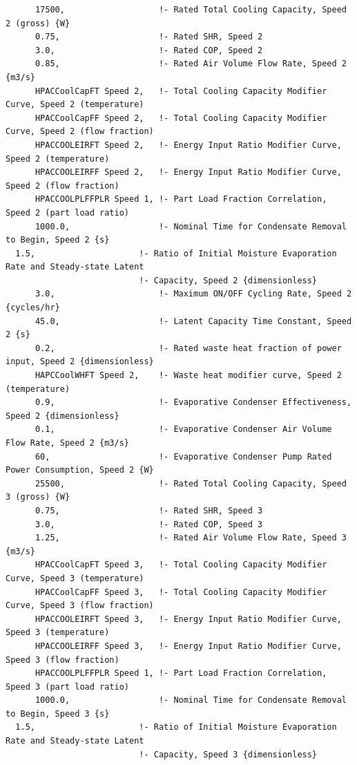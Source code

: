 \begin{lstlisting}
      17500,                   !- Rated Total Cooling Capacity, Speed 2 (gross) {W}
      0.75,                    !- Rated SHR, Speed 2
      3.0,                     !- Rated COP, Speed 2
      0.85,                    !- Rated Air Volume Flow Rate, Speed 2 {m3/s}
      HPACCoolCapFT Speed 2,   !- Total Cooling Capacity Modifier Curve, Speed 2 (temperature)
      HPACCoolCapFF Speed 2,   !- Total Cooling Capacity Modifier Curve, Speed 2 (flow fraction)
      HPACCOOLEIRFT Speed 2,   !- Energy Input Ratio Modifier Curve, Speed 2 (temperature)
      HPACCOOLEIRFF Speed 2,   !- Energy Input Ratio Modifier Curve, Speed 2 (flow fraction)
      HPACCOOLPLFFPLR Speed 1, !- Part Load Fraction Correlation, Speed 2 (part load ratio)
      1000.0,                  !- Nominal Time for Condensate Removal to Begin, Speed 2 {s}
  1.5,                     !- Ratio of Initial Moisture Evaporation Rate and Steady-state Latent
                           !- Capacity, Speed 2 {dimensionless}
      3.0,                     !- Maximum ON/OFF Cycling Rate, Speed 2 {cycles/hr}
      45.0,                    !- Latent Capacity Time Constant, Speed 2 {s}
      0.2,                     !- Rated waste heat fraction of power input, Speed 2 {dimensionless}
      HAPCCoolWHFT Speed 2,    !- Waste heat modifier curve, Speed 2 (temperature)
      0.9,                     !- Evaporative Condenser Effectiveness, Speed 2 {dimensionless}
      0.1,                     !- Evaporative Condenser Air Volume Flow Rate, Speed 2 {m3/s}
      60,                      !- Evaporative Condenser Pump Rated Power Consumption, Speed 2 {W}
      25500,                   !- Rated Total Cooling Capacity, Speed 3 (gross) {W}
      0.75,                    !- Rated SHR, Speed 3
      3.0,                     !- Rated COP, Speed 3
      1.25,                    !- Rated Air Volume Flow Rate, Speed 3 {m3/s}
      HPACCoolCapFT Speed 3,   !- Total Cooling Capacity Modifier Curve, Speed 3 (temperature)
      HPACCoolCapFF Speed 3,   !- Total Cooling Capacity Modifier Curve, Speed 3 (flow fraction)
      HPACCOOLEIRFT Speed 3,   !- Energy Input Ratio Modifier Curve, Speed 3 (temperature)
      HPACCOOLEIRFF Speed 3,   !- Energy Input Ratio Modifier Curve, Speed 3 (flow fraction)
      HPACCOOLPLFFPLR Speed 1, !- Part Load Fraction Correlation, Speed 3 (part load ratio)
      1000.0,                  !- Nominal Time for Condensate Removal to Begin, Speed 3 {s}
  1.5,                     !- Ratio of Initial Moisture Evaporation Rate and Steady-state Latent
                           !- Capacity, Speed 3 {dimensionless}

\end{lstlisting}
